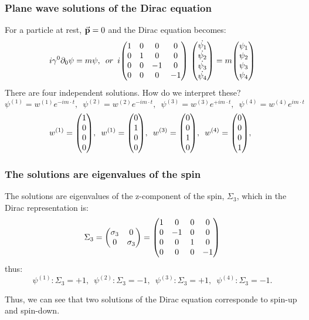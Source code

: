 \begin{frame}
\frametitle{Plane wave solutions of the Dirac equation}
For a particle at rest, $\va{p} = 0$ and the Dirac equation becomes:
\[
i\gamma^0\partial_0\psi = m \psi, \,\,\, or \, \, \,  i \mqty(1 & 0 & 0 & 0\\ 0 & 1 & 0 & 0 \\
0 & 0 & -1 & 0 \\ 0 & 0 & 0 & -1 ) \ \mqty(\dot{\psi_1} \\ \dot{\psi_2}\\ \dot{\psi_3} \\ \dot{\psi_4}) = 
m \mqty(\psi_1 \\ \psi_2\\ \psi_3 \\ \psi_4)
\]
There are four independent solutions. How do we interpret these?
\[
\psi^{(1)} = w^{(1)} e^{-i m\cdot t}, \,\,\, \psi^{(2)} = w^{(2)} e^{-i m\cdot t}, \,\,\,
\psi^{(3)} = w^{(3)} e^{+i m\cdot t}, \,\,\, \psi^{(4)} = w^{(4)} e^{i m\cdot t}
\]
\[
w^{(1)} = \mqty(1 \\ 0 \\ 0 \\ 0), \,\,\, w^{(1)} = \mqty(0\\ 1 \\ 0 \\ 0), \,\,\,
w^{(3)} = \mqty(0 \\ 0 \\ 1 \\ 0), \,\,\, w^{(4)} = \mqty(0 \\ 0 \\ 0 \\ 1), \,\,\,
\]

\end{frame}
\begin{frame}
\frametitle{The solutions are eigenvalues of the spin}
The solutions are eigenvalues of the z-component of the spin, $\Sigma_3$, which in the Dirac representation is:
\[
\Sigma_3 = \mqty(\sigma_3 & 0 \\ 0 &  \sigma_3) = \mqty(1 & 0 & 0 & 0\\ 0 & -1 & 0 & 0 \\
0 & 0 & 1 & 0 \\ 0 & 0 & 0 & -1 )
\]
thus:
\[
\psi^{(1)} : \Sigma_3 = +1, \,\,\,
\psi^{(2)} : \Sigma_3 = -1, \,\,\,
\psi^{(3)} : \Sigma_3 = +1, \,\,\,
\psi^{(4)} : \Sigma_3 = -1.
\]

Thus, we can see that two solutions of the Dirac equation corresponde to spin-up and spin-down. 
\end{frame}
